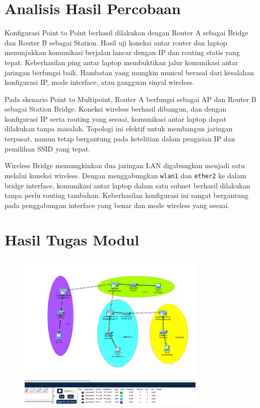 \section{Analisis Hasil Percobaan} 
Konfigurasi Point to Point berhasil dilakukan dengan Router A sebagai Bridge dan Router B sebagai Station. Hasil uji koneksi antar router dan laptop menunjukkan komunikasi berjalan lancar dengan IP dan routing statis yang tepat. Keberhasilan ping antar laptop membuktikan jalur komunikasi antar jaringan berfungsi baik. Hambatan yang mungkin muncul berasal dari kesalahan konfigurasi IP, mode interface, atau gangguan sinyal wireless.
 
Pada skenario Point to Multipoint, Router A berfungsi sebagai AP dan Router B sebagai Station Bridge. Koneksi wireless berhasil dibangun, dan dengan konfigurasi IP serta routing yang sesuai, komunikasi antar laptop dapat dilakukan tanpa masalah. Topologi ini efektif untuk membangun jaringan terpusat, namun tetap bergantung pada ketelitian dalam pengisian IP dan pemilihan SSID yang tepat.
 
Wireless Bridge memungkinkan dua jaringan LAN digabungkan menjadi satu melalui koneksi wireless. Dengan menggabungkan \texttt{wlan1} dan \texttt{ether2} ke dalam bridge interface, komunikasi antar laptop dalam satu subnet berhasil dilakukan tanpa perlu routing tambahan. Keberhasilan konfigurasi ini sangat bergantung pada penggabungan interface yang benar dan mode wireless yang sesuai.


\section{Hasil Tugas Modul}
\begin{figure}[H]
\centering
\includegraphics[width=0.8\textwidth]{P1/img/1.png}
    \end{figure}

